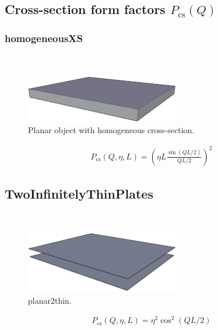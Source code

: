 \clearpage

\subsection{Cross-section form factors $P_\text{cs}(Q)$}

\subsubsection{homogeneousXS}
\label{sect:homogeneousXS}
\hspace{1pt} \\
\begin{figure}[htb]
\begin{center}
\includegraphics[width=0.6\textwidth]{planarHomo.png}
\end{center}
\caption{Planar object with homogeneous cross-section.}
\label{fig:planarHomo}
\end{figure}

\begin{align}
P_\text{cs}(Q,\eta,L) = \left( \eta L\frac{\sin(QL/2)}{QL/2}\right)^2
\end{align}

\clearpage
\subsection{TwoInfinitelyThinPlates}
\label{sect:TwoInfinitelyThinPlates}
\hspace{1pt} \\
\begin{figure}[htb]
\begin{center}
\includegraphics[width=0.6\textwidth]{planar2thin.png}
\end{center}
\caption{planar2thin.}
\label{fig:planar2thin}
\end{figure}
\begin{align}
P_\text{cs}(Q,\eta,L) = \eta^2 \cos^2(QL/2)
\end{align}


